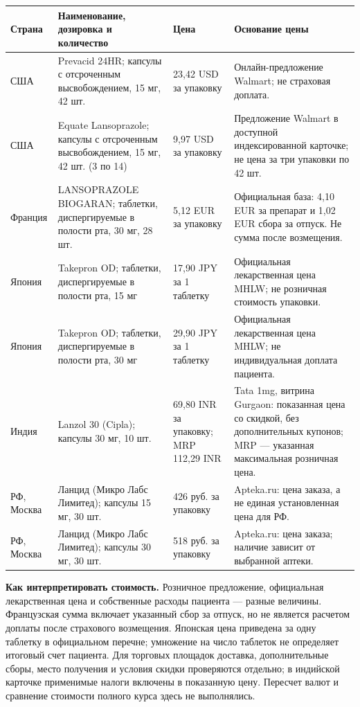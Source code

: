 \documentclass[11pt,a4paper,notitlepage]{report}
\newcommand{\src}[1]{\unskip\space\cite{#1}}
\begin{document}
\begin{longtable}{P{0.13\textwidth}P{0.30\textwidth}P{0.18\textwidth}P{0.28\textwidth}}
\toprule
Страна & Наименование, дозировка и количество & Цена & Основание цены \\
\midrule
\endhead
США & Prevacid 24HR; капсулы с отсроченным высвобождением, 15 мг, 42 шт. & 23,42 USD за упаковку & Онлайн-предложение Walmart; не страховая доплата.\src{priceusprev} \\
США & Equate Lansoprazole; капсулы с отсроченным высвобождением, 15 мг, 42 шт. (3 по 14) & 9,97 USD за упаковку & Предложение Walmart в доступной индексированной карточке; не цена за три упаковки по 42 шт.\src{priceusequate} \\
Франция & LANSOPRAZOLE BIOGARAN; таблетки, диспергируемые в полости рта, 30 мг, 28 шт. & 5,12 EUR за упаковку & Официальная база: 4,10 EUR за препарат и 1,02 EUR сбора за отпуск. Не сумма после возмещения.\src{pricefrbio} \\
Япония & Takepron OD; таблетки, диспергируемые в полости рта, 15 мг & 17,90 JPY за 1 таблетку & Официальная лекарственная цена MHLW; не розничная стоимость упаковки.\src{pricejptake} \\
Япония & Takepron OD; таблетки, диспергируемые в полости рта, 30 мг & 29,90 JPY за 1 таблетку & Официальная лекарственная цена MHLW; не индивидуальная доплата пациента.\src{pricejptake} \\
Индия & Lanzol 30 (Cipla); капсулы 30 мг, 10 шт. & 69,80 INR за упаковку; MRP 112,29 INR & Tata 1mg, витрина Gurgaon: показанная цена со скидкой, без дополнительных купонов; MRP --- указанная максимальная розничная цена.\src{priceinlanzol} \\
РФ, Москва & Ланцид (Микро Лабс Лимитед); капсулы 15 мг, 30 шт. & 426 руб. за упаковку & Apteka.ru: цена заказа, а не единая установленная цена для РФ.\src{pricerulancid} \\
РФ, Москва & Ланцид (Микро Лабс Лимитед); капсулы 30 мг, 30 шт. & 518 руб. за упаковку & Apteka.ru: цена заказа; наличие зависит от выбранной аптеки.\src{pricerulancid} \\
\bottomrule
\end{longtable}

\textbf{Как интерпретировать стоимость.} Розничное предложение, официальная лекарственная цена и собственные расходы пациента --- разные величины. Французская сумма включает указанный сбор за отпуск, но не является расчетом доплаты после страхового возмещения. Японская цена приведена за одну таблетку в официальном перечне; умножение на число таблеток не определяет итоговый счет пациента. Для торговых площадок доставка, дополнительные сборы, место получения и условия скидки проверяются отдельно; в индийской карточке применимые налоги включены в показанную цену. Пересчет валют и сравнение стоимости полного курса здесь не выполнялись.\src{pricefrbio,pricejptake,priceusprev,priceusequate,priceinlanzol,pricerulancid}
\end{document}
